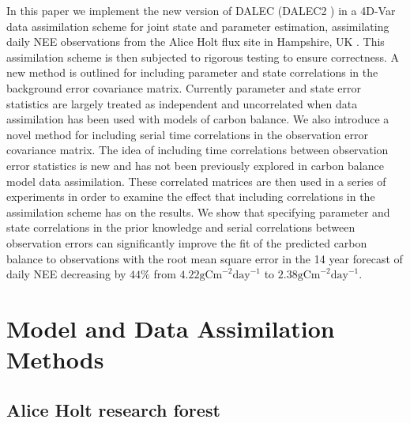\documentclass[review]{elsarticle}
\begin{document}
In this paper we implement the new version of DALEC (DALEC2 \citep{Bloom2015}) in a 4D-Var data assimilation scheme for joint state and parameter estimation, assimilating daily NEE observations from the Alice Holt flux site in Hampshire, UK \citep{wilkinson2012inter}. This assimilation scheme is then subjected to rigorous testing to ensure correctness. A new method is outlined for including parameter and state correlations in the background error covariance matrix. Currently parameter and state error statistics are largely treated as independent and uncorrelated when data assimilation has been used with models of carbon balance. We also introduce a novel method for including serial time correlations in the observation error covariance matrix. The idea of including time correlations between observation error statistics is new and has not been previously explored in carbon balance model data assimilation. These correlated matrices are then used in a series of experiments in order to examine the effect that including correlations in the assimilation scheme has on the results. We show that specifying parameter and state correlations in the prior knowledge and serial correlations between observation errors can significantly improve the fit of the predicted carbon balance to observations with the root mean square error in the 14 year forecast of daily NEE decreasing by $44\%$ from $4.22\text{gCm}^{-2}\text{day}^{-1}$ to $2.38\text{gCm}^{-2}\text{day}^{-1}$.

\section{Model and Data Assimilation Methods}

\subsection{Alice Holt research forest}
\end{document}

